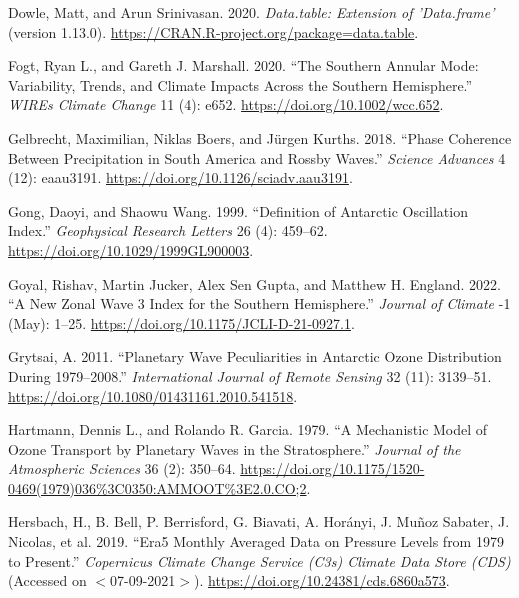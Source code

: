 \documentclass[smallextended]{svjour3}       %
\newlength{\cslhangindent}
\newlength{\cslentryspacingunit} %
\newenvironment{CSLReferences}[2] %
 {%
  \setlength{\parindent}{0pt}
  \ifodd #1
  \let\oldpar\par
  \def\par{\hangindent=\cslhangindent\oldpar}
  \fi
  \setlength{\parskip}{#2\cslentryspacingunit}
 }%
 {}
\begin{document}
\begin{CSLReferences}{1}{0}
\leavevmode{}%
Dowle, Matt, and Arun Srinivasan. 2020. \emph{Data.table: {Extension} of 'Data.frame'} (version 1.13.0). \url{https://CRAN.R-project.org/package=data.table}.

\leavevmode{}%
Fogt, Ryan L., and Gareth J. Marshall. 2020. {``The {Southern Annular Mode}: {Variability}, Trends, and Climate Impacts Across the {Southern Hemisphere}.''} \emph{WIREs Climate Change} 11 (4): e652. \url{https://doi.org/10.1002/wcc.652}.

\leavevmode{}%
Gelbrecht, Maximilian, Niklas Boers, and Jürgen Kurths. 2018. {``Phase Coherence Between Precipitation in {South America} and {Rossby} Waves.''} \emph{Science Advances} 4 (12): eaau3191. \url{https://doi.org/10.1126/sciadv.aau3191}.

\leavevmode{}%
Gong, Daoyi, and Shaowu Wang. 1999. {``Definition of {Antarctic Oscillation} Index.''} \emph{Geophysical Research Letters} 26 (4): 459--62. \url{https://doi.org/10.1029/1999GL900003}.

\leavevmode{}%
Goyal, Rishav, Martin Jucker, Alex Sen Gupta, and Matthew H. England. 2022. {``A New Zonal Wave 3 Index for the {Southern Hemisphere}.''} \emph{Journal of Climate} -1 (May): 1--25. \url{https://doi.org/10.1175/JCLI-D-21-0927.1}.

\leavevmode{}%
Grytsai, A. 2011. {``Planetary Wave Peculiarities in {Antarctic} Ozone Distribution During 1979--2008.''} \emph{International Journal of Remote Sensing} 32 (11): 3139--51. \url{https://doi.org/10.1080/01431161.2010.541518}.

\leavevmode{}%
Hartmann, Dennis L., and Rolando R. Garcia. 1979. {``A {Mechanistic Model} of {Ozone Transport} by {Planetary Waves} in the {Stratosphere}.''} \emph{Journal of the Atmospheric Sciences} 36 (2): 350--64. \url{https://doi.org/10.1175/1520-0469(1979)036\%3C0350:AMMOOT\%3E2.0.CO;2}.

\leavevmode{}%
Hersbach, H., B. Bell, P. Berrisford, G. Biavati, A. Horányi, J. Muñoz Sabater, J. Nicolas, et al. 2019. {``{Era5} Monthly Averaged Data on Pressure Levels from 1979 to Present.''} \emph{{Copernicus Climate Change Service} ({C3s}) {Climate Data Store} ({CDS})} (Accessed on {\(<\)}07-09-2021{\(>\)}). \url{https://doi.org/10.24381/cds.6860a573}.


\end{CSLReferences}
\end{document}
